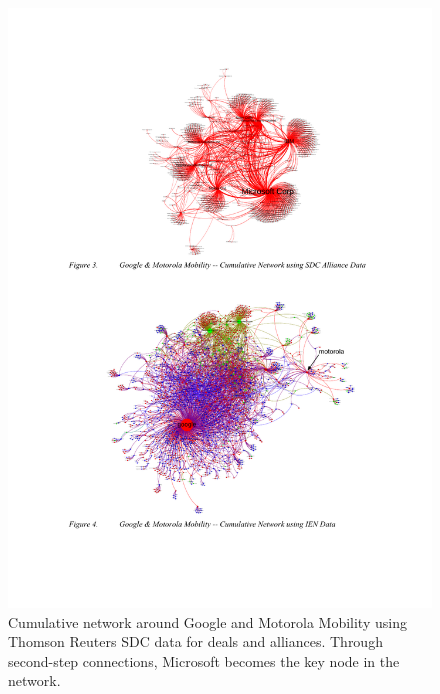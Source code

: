 \begin{figure}[htb]
\centering
\includegraphics[]{figure/Mobile-Ecosystem-Google-Motorola-SDC.pdf}
\caption{Cumulative network around Google and Motorola Mobility using Thomson Reuters SDC data for deals and alliances. Through second-step connections, Microsoft becomes the key node in the network. \citep{Basole2012UnderstandingApproach}}
\label{fig:mobile-ecosystem-sdc}
\end{figure}

